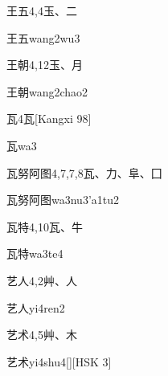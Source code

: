 \begin{entry}{王五}{4,4}{⽟、⼆}
  \begin{phonetics}{王五}{wang2wu3}
  \end{phonetics}
\end{entry}

\begin{entry}{王朝}{4,12}{⽟、⽉}
  \begin{phonetics}{王朝}{wang2chao2}
  \end{phonetics}
\end{entry}

\begin{entry}{瓦}{4}{⽡}[Kangxi 98]
  \begin{phonetics}{瓦}{wa3}
  \end{phonetics}
\end{entry}

\begin{entry}{瓦努阿图}{4,7,7,8}{⽡、⼒、⾩、⼞}
  \begin{phonetics}{瓦努阿图}{wa3nu3'a1tu2}
  \end{phonetics}
\end{entry}

\begin{entry}{瓦特}{4,10}{⽡、⽜}
  \begin{phonetics}{瓦特}{wa3te4}
  \end{phonetics}
\end{entry}

\begin{entry}{艺人}{4,2}{⾋、⼈}
  \begin{phonetics}{艺人}{yi4ren2}
  \end{phonetics}
\end{entry}

\begin{entry}{艺术}{4,5}{⾋、⽊}
  \begin{phonetics}{艺术}{yi4shu4}[][HSK 3]
  \end{phonetics}
\end{entry}

